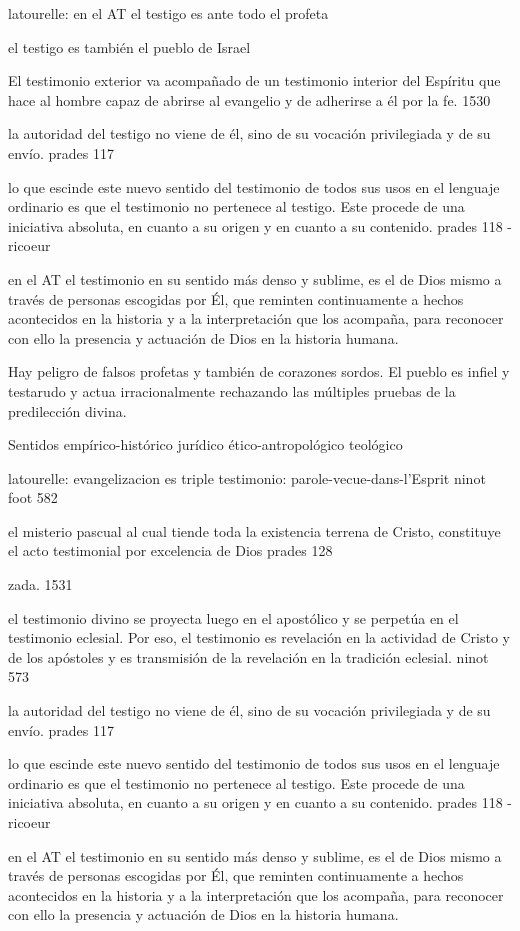 latourelle:
en el AT el testigo es ante todo el
profeta

el testigo es también el pueblo de Israel

El testimonio exterior va acompañado de un testimonio interior del Espíritu que
hace al hombre capaz de abrirse al evangelio y de adherirse a él por la fe. 1530

la autoridad del testigo no viene de él, sino de su vocación privilegiada y de
su envío. prades 117

lo que escinde este nuevo sentido del testimonio de todos sus usos en el
lenguaje ordinario es que el testimonio no pertenece al testigo. Este procede de
una iniciativa absoluta, en cuanto a su origen y en cuanto a su contenido.
prades 118 - ricoeur

en el AT el testimonio en su sentido más denso y sublime, es el de Dios mismo a
través de personas escogidas por Él, que reminten continuamente a hechos
acontecidos en la historia y a la interpretación que los acompaña, para
reconocer con ello la presencia y actuación de Dios en la historia humana.

Hay peligro de falsos profetas y también de corazones sordos.
El pueblo es infiel y testarudo y actua irracionalmente rechazando las múltiples
pruebas de la predilección divina.

Sentidos
empírico-histórico
jurídico
ético-antropológico
teológico

latourelle:
evangelizacion es triple testimonio:
parole-vecue-dans-l'Esprit
ninot foot 582


el misterio pascual al cual tiende toda la existencia terrena de Cristo,
constituye el acto testimonial por excelencia de Dios prades 128

zada. 1531

el testimonio divino se proyecta luego en el apostólico y se perpetúa en el
testimonio eclesial. Por eso, el testimonio es revelación en la actividad de
Cristo y de los apóstoles y es transmisión de la revelación en la tradición
eclesial. ninot 573

la autoridad del testigo no viene de él, sino de su vocación privilegiada y de
su envío. prades 117

lo que escinde este nuevo sentido del testimonio de todos sus usos en el
lenguaje ordinario es que el testimonio no pertenece al testigo. Este procede de
una iniciativa absoluta, en cuanto a su origen y en cuanto a su contenido.
prades 118 - ricoeur

en el AT el testimonio en su sentido más denso y sublime, es el de Dios mismo a
través de personas escogidas por Él, que reminten continuamente a hechos
acontecidos en la historia y a la interpretación que los acompaña, para
reconocer con ello la presencia y actuación de Dios en la historia humana.

